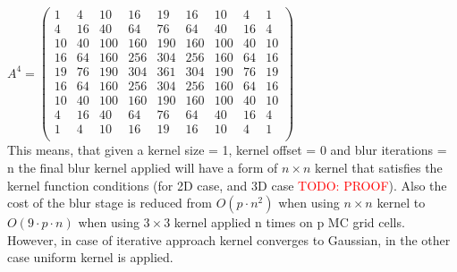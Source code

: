 $A^4 = 
\begin{pmatrix}
1 & 4 & 10 & 16 & 19 & 16 & 10 & 4 & 1\\
4 & 16 & 40 & 64 & 76 & 64 & 40 & 16 & 4\\
10 & 40 & 100 & 160 & 190 & 160 & 100 & 40 & 10\\
16 & 64 & 160 & 256 & 304 & 256 & 160 & 64 & 16\\
19 & 76 & 190 & 304 & 361 & 304 & 190 & 76 & 19\\
16 & 64 & 160 & 256 & 304 & 256 & 160 & 64 & 16\\
10 & 40 & 100 & 160 & 190 & 160 & 100 & 40 & 10\\
4 & 16 & 40 & 64 & 76 & 64 & 40 & 16 & 4\\
1 & 4 & 10 & 16 & 19 & 16 & 10 & 4 & 1\\
\end{pmatrix}$\\
This means, that given a kernel size = 1, kernel offset = 0 and blur iterations = n the final blur kernel applied will have a form of $ n \times n$ kernel that satisfies the kernel function conditions (for 2D case, and 3D case \textcolor{red}{TODO: PROOF}). Also the cost of the blur stage is reduced from $O(p \cdot n^2)$ when using $n \times n$ kernel to $O(9 \cdot p \cdot n)$ when using $3\times 3$ kernel applied n times on p MC grid cells. However, in  case of iterative approach kernel converges to Gaussian, in the other case uniform kernel is applied. 


